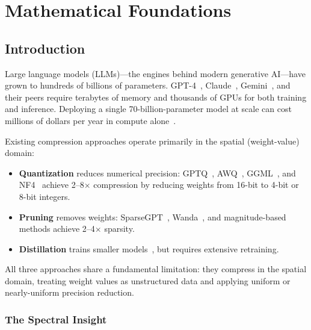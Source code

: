 \documentclass[11pt,a4paper,openright]{book}
\begin{document}
\mainmatter

\part{Mathematical Foundations}

\chapter{Introduction}
\label{ch:introduction}

Large language models (LLMs)---the engines behind modern generative AI---have grown to hundreds of billions of parameters. GPT-4~\cite{openai2023gpt4}, Claude~\cite{anthropic2024claude}, Gemini~\cite{google2024gemini}, and their peers require terabytes of memory and thousands of GPUs for both training and inference. Deploying a single 70-billion-parameter model at scale can cost millions of dollars per year in compute alone~\cite{patel2023cost}.

Existing compression approaches operate primarily in the spatial (weight-value) domain:

\begin{itemize}
	\item \textbf{Quantization} reduces numerical precision: GPTQ~\cite{frantar2023gptq}, AWQ~\cite{lin2024awq}, GGML~\cite{gerganov2023ggml}, and NF4~\cite{dettmers2023qlora} achieve 2--8$\times$ compression by reducing weights from 16-bit to 4-bit or 8-bit integers.
	\item \textbf{Pruning} removes weights: SparseGPT~\cite{frantar2023sparsegpt}, Wanda~\cite{sun2023wanda}, and magnitude-based methods achieve 2--4$\times$ sparsity.
	\item \textbf{Distillation} trains smaller models~\cite{hinton2015distilling}, but requires extensive retraining.
\end{itemize}

All three approaches share a fundamental limitation: they compress in the spatial domain, treating weight values as unstructured data and applying uniform or nearly-uniform precision reduction.

\section{The Spectral Insight}
\end{document}
